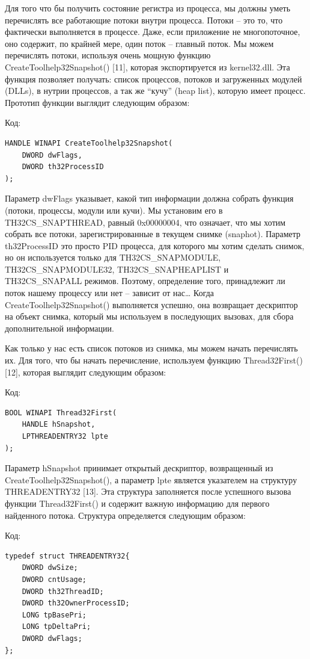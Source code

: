 \documentclass[12pt]{book}
\begin{document}
Для того что бы получить состояние регистра из процесса, мы должны уметь перечислять все работающие потоки внутри процесса. Потоки – это то, что фактически выполняется в процессе. Даже, если приложение не многопоточное, оно содержит, по крайней мере, один поток – главный поток. Мы можем перечислять потоки, используя очень мощную функцию CreateToolhelp32Snapshot() [11], которая экспортируется из kernel32.dll. Эта функция позволяет получать: список процессов, потоков и загруженных модулей (DLLs), в нутрии процессов, а так же “кучу” (heap list), которую имеет процесс. Прототип функции выглядит следующим образом:

Код:
\begin{lstlisting}
HANDLE WINAPI CreateToolhelp32Snapshot(
    DWORD dwFlags,
    DWORD th32ProcessID
);
\end{lstlisting}

Параметр dwFlags указывает, какой тип информации должна собрать функция (потоки, процессы, модули или кучи). Мы установим его в TH32CS\_SNAPTHREAD, равный 0x00000004, что означает, что мы хотим собрать все потоки, зарегистрированные в текущем снимке (snaphot). Параметр th32ProcessID это просто PID процесса, для которого мы хотим сделать снимок, но он используется только для TH32CS\_SNAPMODULE, TH32CS\_SNAPMODULE32, TH32CS\_SNAPHEAPLIST и TH32CS\_SNAPALL режимов. Поэтому, определение того, принадлежит ли поток нашему процессу или нет – зависит от нас… Когда CreateToolhelp32Snapshot() выполняется успешно, она возвращает дескриптор на объект снимка, который мы используем в последующих вызовах, для сбора дополнительной информации.

Как только у нас есть список потоков из снимка, мы можем начать перечислять их. Для того, что бы начать перечисление, используем функцию Thread32First() [12], которая выглядит следующим образом:

Код:
\begin{lstlisting}
BOOL WINAPI Thread32First(
    HANDLE hSnapshot,
    LPTHREADENTRY32 lpte
);
\end{lstlisting}

Параметр hSnapshot принимает открытый дескриптор, возвращенный из CreateToolhelp32Snapshot(), а параметр lpte является указателем на структуру THREADENTRY32 [13]. Эта структура заполняется после успешного вызова функции Thread32First() и содержит важную информацию для первого найденного потока. Структура определяется следующим образом:

Код:
\begin{lstlisting}
typedef struct THREADENTRY32{
    DWORD dwSize;
    DWORD cntUsage;
    DWORD th32ThreadID;
    DWORD th32OwnerProcessID;
    LONG tpBasePri;
    LONG tpDeltaPri;
    DWORD dwFlags;
};
\end{lstlisting}
\end{document}
